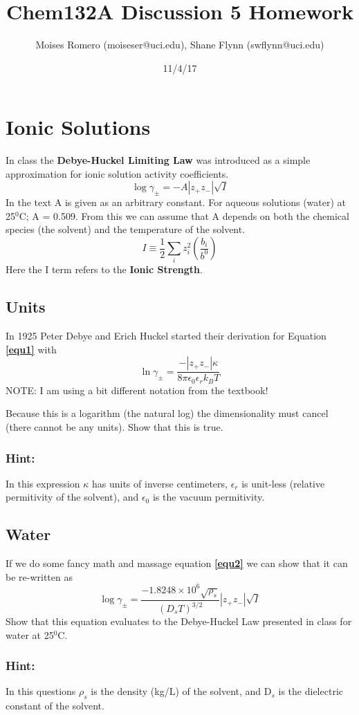 \documentclass{article}
\title{Chem132A Discussion 5 Homework}
\author{Moises Romero (moiseser@uci.edu), Shane Flynn (swflynn@uci.edu) }
\date{11/4/17}
\newcommand{\be}{\begin{equation}}
\newcommand{\ee}{\end{equation}}
\begin{document}
\maketitle

\section{Ionic Solutions}
In class the \textbf{Debye-Huckel Limiting Law} was introduced as a simple approximation for ionic solution activity coefficients. 
\be \label{equ1}
\log \gamma_\pm = -A|z_+z_-|\sqrt{I}
\ee
In the text A is given as an arbitrary constant. 
For aqueous solutions (water) at 25$^0$C; A = 0.509.
From this we can assume that A depends on both the chemical species (the solvent) and the temperature of the solvent. 
\be
I \equiv \frac{1}{2}\sum_i z_i^2\left(\frac{b_i}{b^0}\right)
\ee
Here the I term refers to the \textbf{Ionic Strength}. 

\subsection{Units}
In 1925 Peter Debye and Erich Huckel started their derivation for Equation \textbf{\ref{equ1}} with
\be \label{equ2}
\ln \gamma_\pm = \frac{-|z_+z_-|\kappa}{8\pi \epsilon_0 \epsilon_r k_BT}
\ee
NOTE: I am using a bit different notation from the textbook!

Because this is a logarithm (the natural log) the dimensionality must cancel (there cannot be any units).
 Show that this is true. 

\subsubsection*{Hint:}
In this expression $\kappa$ has units of inverse centimeters, $\epsilon_r$ is unit-less (relative permitivity of the solvent), and  $\epsilon_0$ is the vacuum permitivity.

\subsection{Water}
If we do some fancy math and massage equation \textbf{\ref{equ2}} we can show that it can be re-written as
\be \label{equ4}
\log \gamma_\pm = \frac{-1.8248\times 10^6 \sqrt{\rho_s}}{(D_sT)^{3/2}} |z_+z_-|\sqrt{I}
\ee
Show that this equation evaluates to the Debye-Huckel Law presented in class for water at 25$^0$C. 

\subsubsection*{Hint:}
In this questions $\rho_s$ is the density (kg/L) of the solvent, and D$_s$ is the dielectric constant of the solvent. 
\end{document}
